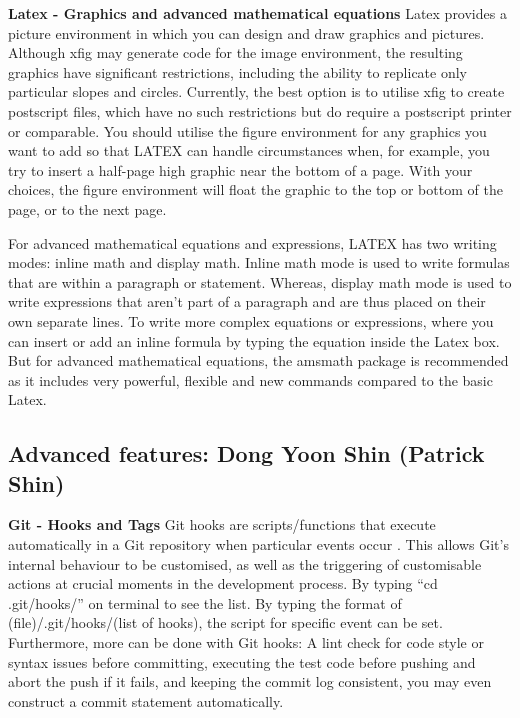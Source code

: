 \documentclass[a4paper, 11pt]{report}
\begin{document}
\textbf{Latex - Graphics and advanced mathematical equations}
Latex provides a picture environment in which you can design and draw graphics and pictures. Although xfig may generate code for the image environment, the resulting graphics have significant restrictions, including the ability to replicate only particular slopes and circles. Currently, the best option is to utilise xfig to create postscript files, which have no such restrictions but do require a postscript printer or comparable. You should utilise the figure environment for any graphics you want to add so that LATEX can handle circumstances when, for example, you try to insert a half-page high graphic near the bottom of a page. With your choices, the figure environment will float the graphic to the top or bottom of the page, or to the next page.

For advanced mathematical equations and expressions, LATEX has two writing modes: inline math and display math. Inline math mode is used to write formulas that are within a paragraph or statement. Whereas, display math mode is used to write expressions that aren't part of a paragraph and are thus placed on their own separate lines. To write more complex equations or expressions, where you can insert or add an inline formula by typing the equation inside the Latex box. But for advanced mathematical equations, the amsmath package is recommended as it includes very powerful, flexible and new commands compared to the basic Latex.


\subsection{Advanced features: Dong Yoon Shin (Patrick Shin)}
\textbf{Git - Hooks and Tags}
Git hooks are scripts/functions that execute automatically in a Git repository when particular events occur \cite{patty2}. This allows Git's internal behaviour to be customised, as well as the triggering of customisable actions at crucial moments in the development process. By typing “cd .git/hooks/” on terminal to see the list. By typing the format of (file)/.git/hooks/(list of hooks), the script for specific event can be set. Furthermore, more can be done with Git hooks: A lint check for code style or syntax issues before committing, executing the test code before pushing and abort the push if it fails, and keeping the commit log consistent, you may even construct a commit statement automatically.
\end{document}
